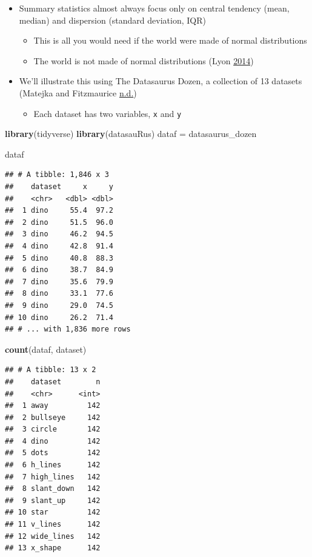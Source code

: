\documentclass[
]{article}
\newenvironment{Shaded}{\begin{snugshade}}{\end{snugshade}}
\newcommand{\KeywordTok}[1]{\textcolor[rgb]{0.13,0.29,0.53}{\textbf{#1}}}
\newcommand{\NormalTok}[1]{#1}
\newcommand{\StringTok}[1]{\textcolor[rgb]{0.31,0.60,0.02}{#1}}
\providecommand{\tightlist}{%
  \setlength{\itemsep}{0pt}\setlength{\parskip}{0pt}}
\begin{document}
\begin{itemize}
\tightlist
\item
  Summary statistics almost always focus only on central tendency (mean, median) and dispersion (standard deviation, IQR)

  \begin{itemize}
  \tightlist
  \item
    This is all you would need if the world were made of normal distributions
  \item
    The world is not made of normal distributions (Lyon \protect\hyperlink{ref-LyonWhyAreNormal2014}{2014})
  \end{itemize}
\item
  We'll illustrate this using The Datasaurus Dozen, a collection of 13 datasets (Matejka and Fitzmaurice \protect\hyperlink{ref-MatejkaSameStatsDifferent}{n.d.})

  \begin{itemize}
  \tightlist
  \item
    Each dataset has two variables, \texttt{x} and \texttt{y}
  \end{itemize}
\end{itemize}

\begin{Shaded}
\begin{Highlighting}[]
\KeywordTok{library}\NormalTok{(tidyverse)}
\KeywordTok{library}\NormalTok{(datasauRus)}
\NormalTok{dataf =}\StringTok{ }\NormalTok{datasaurus\_dozen}

\NormalTok{dataf}
\end{Highlighting}
\end{Shaded}

\begin{verbatim}
## # A tibble: 1,846 x 3
##    dataset     x     y
##    <chr>   <dbl> <dbl>
##  1 dino     55.4  97.2
##  2 dino     51.5  96.0
##  3 dino     46.2  94.5
##  4 dino     42.8  91.4
##  5 dino     40.8  88.3
##  6 dino     38.7  84.9
##  7 dino     35.6  79.9
##  8 dino     33.1  77.6
##  9 dino     29.0  74.5
## 10 dino     26.2  71.4
## # ... with 1,836 more rows
\end{verbatim}

\begin{Shaded}
\begin{Highlighting}[]
\KeywordTok{count}\NormalTok{(dataf, dataset)}
\end{Highlighting}
\end{Shaded}

\begin{verbatim}
## # A tibble: 13 x 2
##    dataset        n
##    <chr>      <int>
##  1 away         142
##  2 bullseye     142
##  3 circle       142
##  4 dino         142
##  5 dots         142
##  6 h_lines      142
##  7 high_lines   142
##  8 slant_down   142
##  9 slant_up     142
## 10 star         142
## 11 v_lines      142
## 12 wide_lines   142
## 13 x_shape      142
\end{verbatim}
\end{document}
